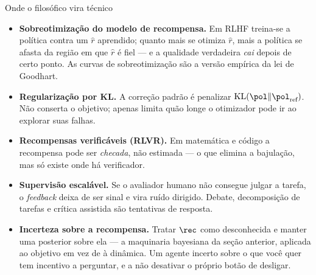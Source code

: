 \documentclass[aspectratio=169, 11pt]{beamer}
\begin{document}
\begin{frame}{Onde o filosófico vira técnico}
  {\footnotesize
  \begin{itemize}\setlength{\itemsep}{0.5ex}
    \item \textbf{Sobreotimização do modelo de recompensa.} Em RLHF treina-se a
          política contra um $\hat{r}$ aprendido; quanto mais se otimiza
          $\hat{r}$, mais a política se afasta da região em que $\hat{r}$ é fiel
          --- e a qualidade verdadeira \emph{cai} depois de certo ponto. As
          curvas de sobreotimização são a versão empírica da lei de Goodhart.
    \item \textbf{Regularização por KL.} A correção padrão é penalizar
          $\mathrm{KL}(\pol\|\pol_{\text{ref}})$. Não conserta o objetivo;
          apenas limita quão longe o otimizador pode ir ao explorar suas falhas.
    \item \textbf{Recompensas verificáveis (RLVR).} Em matemática e código a
          recompensa pode ser \emph{checada}, não estimada --- o que elimina a
          bajulação, mas só existe onde há verificador.
    \item \textbf{Supervisão escalável.} Se o avaliador humano não consegue
          julgar a tarefa, o \emph{feedback} deixa de ser sinal e vira ruído
          dirigido. Debate, decomposição de tarefas e crítica assistida são
          tentativas de resposta.
    \item \textbf{Incerteza sobre a recompensa.} Tratar $\rec$ como desconhecida
          e manter uma posterior sobre ela --- a maquinaria bayesiana da seção
          anterior, aplicada ao objetivo em vez de à dinâmica. Um agente incerto
          sobre o que você quer tem incentivo a perguntar, e a não desativar o
          próprio botão de desligar.
  \end{itemize}}
\end{frame}
\end{document}
